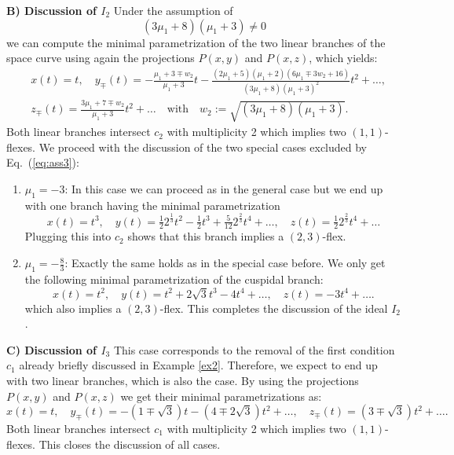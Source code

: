 \documentclass{svproc}
\begin{document}
\noindent
{\bf B) Discussion of $I_2$} \newline
Under the assumption of 
\begin{equation}\label{eq:ass3}
    (3\mu_1 + 8)(\mu_1 + 3)\neq 0
\end{equation}
we can compute the minimal parametrization of the two linear 
branches of the space curve using again the projections $P(x,y)$ and $P(x,z)$, which yields:
\begin{equation}
\begin{split}
&x(t)=t, \quad
y_\mp(t)=
-\tfrac{\mu_1+3\mp w_2}{\mu_1 + 3}t
-
\tfrac{(2\mu_1 + 5)(\mu_1 + 2)(6\mu_1 \mp 3w_2 + 16)}{(3\mu_1 + 8)(\mu_1 + 3)^2}t^2+\ldots, \\
&z_\mp(t)=\tfrac{3\mu_1 + 7 \mp w_2}{\mu_1 + 3}t^2+\ldots \quad \text{with} \quad
w_2:=\sqrt{(3\mu_1 + 8)(\mu_1 + 3)}.
\end{split}
\end{equation}
 Both linear branches intersect $c_2$ with multiplicity 2 which implies two $(1,1)$-flexes. 
 We proceed with the discussion of the two special cases excluded by Eq.\ (\ref{eq:ass3}):
 \begin{enumerate}
     \item 
     $\mu_1=-3$: In this case we can proceed as in the general case but we end up with one branch having the minimal parametrization
     \begin{equation}
         x(t)=t^3, \quad y(t)=\tfrac{1}{2}2^{\tfrac{1}{3}}t^2-\tfrac{1}{2}t^3+\tfrac{5}{12}2^{\tfrac{2}{3}}t^4+\ldots, \quad
         z(t)=\tfrac{1}{2}2^{\tfrac{2}{3}}t^4+\ldots
     \end{equation}
     Plugging this into $c_2$ shows that this branch implies a $(2,3)$-flex.
     \item 
      $\mu_1=-\tfrac{8}{3}$: Exactly the same holds as in the special case before. We only get the following minimal parametrization of the cuspidal branch: 
      \begin{equation}
          x(t)=t^2, \quad
          y(t)=t^2+2\sqrt{3}t^3-4t^4+\ldots, \quad
          z(t)=-3t^4+\ldots .
      \end{equation}
      which also implies a $(2,3)$-flex. 
      This completes the discussion of the ideal $I_2$.
 \end{enumerate}
\noindent
{\bf C) Discussion of $I_3$} \newline
This case corresponds to the removal of the first condition $c_1$ already briefly discussed in Example \ref{ex2}. Therefore, we expect to end up with two linear branches, which is also the case. By using the projections  $P(x,y)$ and $P(x,z)$ we get their minimal parametrizations as:
\begin{equation}
    x(t)=t,\quad
    y_\mp(t)=-(1\mp\sqrt{3})t-(4\mp2\sqrt{3})t^2+\ldots,\quad
    z_\mp(t)=(3\mp\sqrt{3})t^2+\ldots .%
\end{equation}
Both linear branches intersect $c_1$ with multiplicity 2 which implies two $(1,1)$-flexes. This closes the discussion of all cases.
\end{document}
